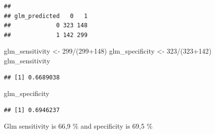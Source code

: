 \documentclass[
]{article}
\newenvironment{Shaded}{\begin{snugshade}}{\end{snugshade}}
\newcommand{\CommentTok}[1]{\textcolor[rgb]{0.56,0.35,0.01}{\textit{#1}}}
\newcommand{\DecValTok}[1]{\textcolor[rgb]{0.00,0.00,0.81}{#1}}
\newcommand{\FloatTok}[1]{\textcolor[rgb]{0.00,0.00,0.81}{#1}}
\newcommand{\FunctionTok}[1]{\textcolor[rgb]{0.00,0.00,0.00}{#1}}
\newcommand{\NormalTok}[1]{#1}
\newcommand{\OtherTok}[1]{\textcolor[rgb]{0.56,0.35,0.01}{#1}}
\newcommand{\SpecialCharTok}[1]{\textcolor[rgb]{0.00,0.00,0.00}{#1}}
\begin{document}
\begin{Shaded}
\end{Shaded}

\begin{verbatim}
##              
## glm_predicted   0   1
##             0 323 148
##             1 142 299
\end{verbatim}

\begin{Shaded}
\begin{Highlighting}[]
\NormalTok{glm\_sensitivity }\OtherTok{\textless{}{-}} \DecValTok{299}\SpecialCharTok{/}\NormalTok{(}\DecValTok{299}\SpecialCharTok{+}\DecValTok{148}\NormalTok{)}
\NormalTok{glm\_specificity }\OtherTok{\textless{}{-}} \DecValTok{323}\SpecialCharTok{/}\NormalTok{(}\DecValTok{323}\SpecialCharTok{+}\DecValTok{142}\NormalTok{)}
\NormalTok{glm\_sensitivity}
\end{Highlighting}
\end{Shaded}

\begin{verbatim}
## [1] 0.6689038
\end{verbatim}

\begin{Shaded}
\begin{Highlighting}[]
\NormalTok{glm\_specificity}
\end{Highlighting}
\end{Shaded}

\begin{verbatim}
## [1] 0.6946237
\end{verbatim}

Glm sensitivity is 66,9 \% and specificity is 69,5 \%

\begin{Shaded}
\end{Shaded}
\end{document}
